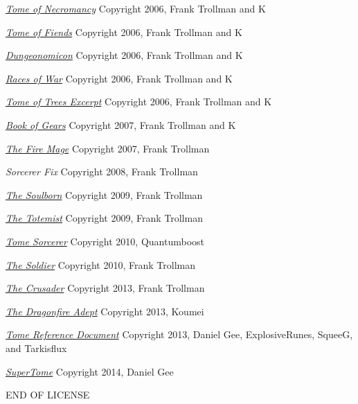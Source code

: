 \begin{small}
\begin{enumerate}
\href{http://www.tgdmb.com/viewtopic.php?t=34248}{\textit{Tome of Necromancy}} Copyright 2006, Frank Trollman and K

\href{http://www.tgdmb.com/viewtopic.php?t=28828}{\textit{Tome of Fiends}} Copyright 2006, Frank Trollman and K

\href{http://www.tgdmb.com/viewtopic.php?t=28547}{\textit{Dungeonomicon}} Copyright 2006, Frank Trollman and K

\href{http://www.tgdmb.com/viewtopic.php?t=33294}{\textit{Races of War}} Copyright 2006, Frank Trollman and K

\href{http://www.tgdmb.com/viewtopic.php?t=33294}{\textit{Tome of Trees Excerpt}} Copyright 2006, Frank Trollman and K

\href{http://www.tgdmb.com/viewtopic.php?t=35813}{\textit{Book of Gears}} Copyright 2007, Frank Trollman and K

\href{http://www.tgdmb.com/viewtopic.php?p=40226#40226}{\textit{The Fire Mage}} Copyright 2007, Frank Trollman

\textit{Sorcerer Fix} Copyright 2008, Frank Trollman

\href{http://www.tgdmb.com/viewtopic.php?t=50472}{\textit{The Soulborn}} Copyright 2009, Frank Trollman

\href{http://www.tgdmb.com/viewtopic.php?t=50483}{\textit{The Totemist}} Copyright 2009, Frank Trollman

\href{http://dndwiki.com/wiki/Sorcerer,_Tome_(3.5e_Class)}{\textit{Tome Sorcerer}} Copyright 2010,  Quantumboost

\href{http://tgdmb.com/viewtopic.php?t=50949}{\textit{The Soldier}} Copyright 2010, Frank Trollman

\href{http://www.tgdmb.com/viewtopic.php?t=54090}{\textit{The Crusader}} Copyright 2013, Frank Trollman

\href{http://www.tgdmb.com/viewtopic.php?p=318737}{\textit{The Dragonfire Adept}} Copyright 2013, Koumei

\href{https://github.com/SqueeG/awesomeTome}{\textit{Tome Reference Document}} Copyright 2013, Daniel Gee, ExplosiveRunes, SqueeG, and Tarkisflux

\href{https://github.com/Lokathor/SuperTome}{\textit{SuperTome}} Copyright 2014, Daniel Gee
\end{enumerate}

END OF LICENSE

\end{small}